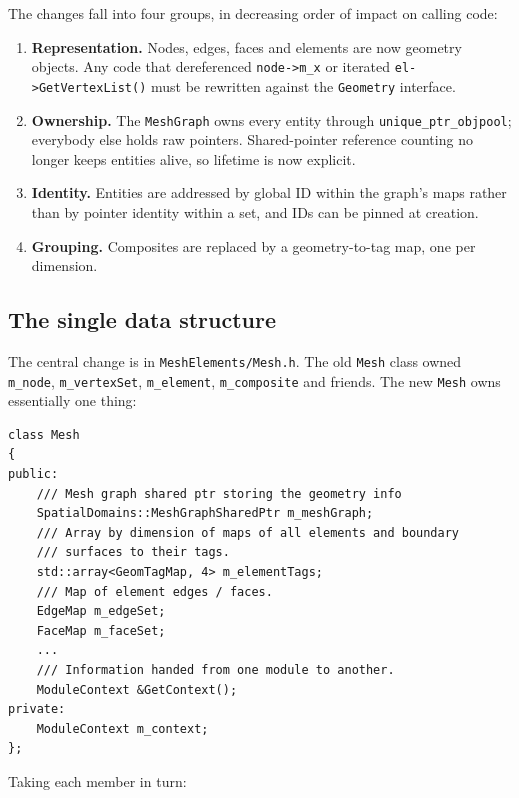 The changes fall into four groups, in decreasing order of impact on
calling code:

\begin{enumerate}
  \item \textbf{Representation.} Nodes, edges, faces and elements are
    now geometry objects. Any code that dereferenced
    \texttt{node->m\_x} or iterated \texttt{el->GetVertexList()} must
    be rewritten against the \texttt{Geometry} interface.
  \item \textbf{Ownership.} The \texttt{MeshGraph} owns every entity
    through \texttt{unique\_ptr\_objpool}; everybody else holds raw
    pointers. Shared-pointer reference counting no longer keeps
    entities alive, so lifetime is now explicit.
  \item \textbf{Identity.} Entities are addressed by global ID within
    the graph's maps rather than by pointer identity within a set, and
    IDs can be pinned at creation.
  \item \textbf{Grouping.} Composites are replaced by a
    geometry-to-tag map, one per dimension.
\end{enumerate}

\subsection{The single data structure}
The central change is in \texttt{MeshElements/Mesh.h}. The old
\texttt{Mesh} class owned \texttt{m\_node}, \texttt{m\_vertexSet},
\texttt{m\_element}, \texttt{m\_composite} and friends. The new
\texttt{Mesh} owns essentially one thing:

\begin{lstlisting}[style=BashInputStyle]
class Mesh
{
public:
    /// Mesh graph shared ptr storing the geometry info
    SpatialDomains::MeshGraphSharedPtr m_meshGraph;
    /// Array by dimension of maps of all elements and boundary
    /// surfaces to their tags.
    std::array<GeomTagMap, 4> m_elementTags;
    /// Map of element edges / faces.
    EdgeMap m_edgeSet;
    FaceMap m_faceSet;
    ...
    /// Information handed from one module to another.
    ModuleContext &GetContext();
private:
    ModuleContext m_context;
};
\end{lstlisting}

Taking each member in turn:

